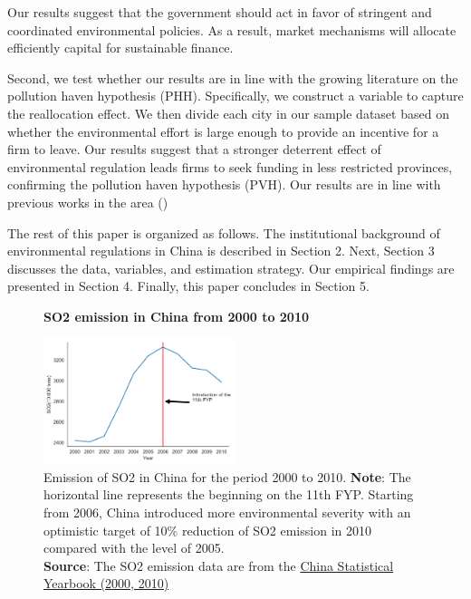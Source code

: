 \documentclass[12pt]{article}
\begin{document}
Our results suggest that the government should act in favor of stringent and coordinated environmental policies. As a result, market mechanisms will allocate efficiently capital for sustainable finance.

Second, we test whether our results are in line with the growing literature on the pollution haven hypothesis (PHH). Specifically, we construct a variable to capture the reallocation effect. We then divide each city in our sample dataset based on whether the environmental effort is large enough to provide an incentive for a firm to leave. Our results suggest that a stronger deterrent effect of environmental regulation leads firms to seek funding in less restricted provinces, confirming the pollution haven hypothesis (PVH). Our results are in line with previous works in the area (\cite{Hering2014-af, Chen2018-ki, Shi2018-zk})

The rest of this paper is organized as follows. The institutional background of environmental regulations in China is described in Section 2. Next, Section 3 discusses the data, variables, and estimation strategy. Our empirical findings are presented in Section 4. Finally, this paper concludes in Section 5.

\begin{figure}[ht]
    \centering
    \textbf{SO2 emission in China from 2000 to 2010}\par\medskip
    \includegraphics[width=0.5\textwidth]{fig_1}
    \caption{
    \small
    Emission of SO2 in China for the period 2000 to 2010.
    \textbf{Note}: The horizontal line represents the beginning on the 11th FYP. Starting from 2006, China introduced more environmental severity with an optimistic target of 10\% reduction of SO2 emission in 2010 compared with the level of 2005.\\
    \textbf{Source}: The SO2 emission data are from the \href{http://www.stats.gov.cn/english/Statisticaldata/AnnualData/}{China Statistical Yearbook (2000, 2010)}}
    \label{fig:figure1}
\end{figure}
\end{document}
